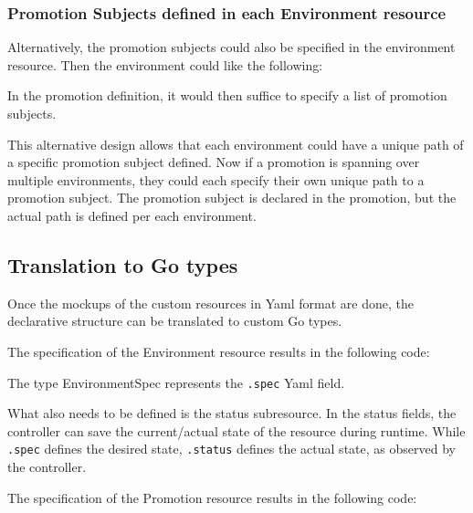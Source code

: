 \subsubsection*{Promotion Subjects defined in each Environment resource}

Alternatively, the promotion subjects could also be specified
in the environment resource.
Then the environment could like the following:



In the promotion definition,
it would then suffice to specify
a list of promotion subjects.



This alternative design allows that each environment could have
a unique path of a specific promotion subject defined.
Now if a promotion is spanning over multiple environments,
they could each specify their own unique path to a promotion subject.
The promotion subject is declared in the promotion,
but the actual path is defined per each environment.

\subsection{Translation to Go types}

Once the mockups of the custom resources in Yaml format are done,
the declarative structure can be translated to custom Go types.

The specification of the Environment resource results in the following code:




The type EnvironmentSpec represents the \lstinline|.spec| Yaml field.

What also needs to be defined is the status subresource.
In the status fields, the controller can save the current/actual state
of the resource during runtime.
While \lstinline|.spec| defines the desired state,
\lstinline|.status| defines the actual state, as observed by the controller.




The specification of the Promotion resource results in the following code:

